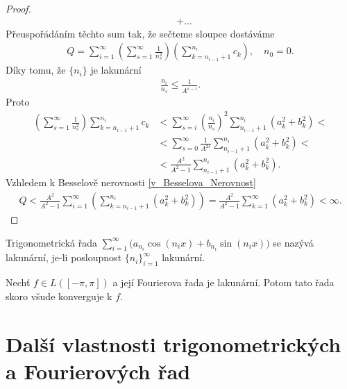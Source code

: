 \begin{theorem}[Kolmogorov]
\begin{proof}
\begin{align*}
&+ \ldots
\end{align*}
Přeuspořádáním těchto sum tak, že sečteme sloupce dostáváme
\begin{align*}
Q = \sum \limits _{i=1}^\infty \left( \sum \limits _{s=1}^\infty \frac{1}{n_s^2}\right) \left( \sum \limits _{k = n_{i-1}+1}^{n_i} c_k \right), \quad n_0 = 0.
\end{align*}
Díky tomu, že $\{n_i\}$ je lakunární
\begin{align*}
\frac{n_i}{n_s} \leq \frac{1}{A^{s-i}}.
\end{align*}
Proto
\begin{align*}
\left( \sum \limits _{s=1}^\infty \frac{1}{n_s^2} \right) \sum \limits _{k=n_{i-1}+1}^{n_i} c_k &< \sum \limits _{s=i}^\infty \left( \frac{n_i}{n_s} \right)^2 \sum \limits _{n_{i-1}+1}^{n_i} (a_k^2 + b_k^2) <\\
&< \sum \limits _{s=0}^\infty \frac{1}{A^{2s}} \sum \limits _{n_{i-1}+1}^{n_i} (a_k^2 + b_k^2) <\\
&< \frac{A^2}{A^2 - 1} \sum \limits _{n_{i-1}+1}^{n_i} (a_k^2 + b_k^2).
\end{align*}
Vzhledem k Besselově nerovnosti \ref{v_Besselova_Nerovnost} 
\begin{align*}
Q <  \frac{A^2}{A^2 - 1} \sum \limits _{i=1}^\infty \left( \sum \limits _{k=n_{i-1}+1}^{n_i} (a_k^2 + b_k^2) \right) = \frac{A^2}{A^2 - 1} \sum \limits _{k=1}^\infty (a_k^2 + b_k^2) < \infty.
\end{align*}
\end{proof}
\end{theorem}

\begin{definition}\label{d_4.16}
Trigonometrická řada $\sum \limits _{i=1}^\infty \big(a_{n_i} \cos (n_i x) + b_{n_i} \sin (n_i x)\big)$ se nazývá lakunární, je-li posloupnost $\{ n_i \}_{i=1}^{\infty}$ lakunární.
\end{definition}

\begin{theorem}[Kolmogorov]\label{v_4.17}
Nechť $f \in L([-\pi, \pi])$ a její Fourierova řada je lakunární. Potom tato řada skoro všude konverguje k $f$.
\end{theorem}




\section{Další vlastnosti trigonometrických a Fourierových řad}

